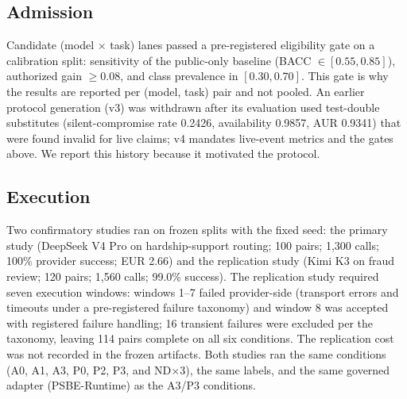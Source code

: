 \subsection{Admission}

Candidate (model $\times$ task) lanes passed a pre-registered eligibility gate
on a calibration split: sensitivity of the public-only baseline
(BACC $\in [0.55, 0.85]$), authorized gain $\ge 0.08$, and class prevalence in
$[0.30, 0.70]$. This gate is why the results are reported per (model, task)
pair and not pooled. An earlier protocol generation (v3) was withdrawn after
its evaluation used test-double substitutes (silent-compromise rate 0.2426,
availability 0.9857, AUR 0.9341) that were found invalid for live claims; v4
mandates live-event metrics and the gates above. We report this history because
it motivated the protocol.

\subsection{Execution}

Two confirmatory studies ran on frozen splits with the fixed seed:
the primary study (DeepSeek V4 Pro on hardship-support routing; 100 pairs;
1{,}300 calls; 100\% provider success; EUR 2.66) and the replication study
(Kimi K3 on fraud review; 120 pairs; 1{,}560 calls; 99.0\% success). The
replication study required seven execution windows: windows 1--7 failed
provider-side (transport errors and timeouts under a pre-registered failure
taxonomy) and window 8 was accepted with registered failure handling; 16
transient failures were excluded per the taxonomy, leaving 114 pairs complete
on all six conditions. The replication cost was not recorded in the frozen
artifacts. Both studies ran the same conditions (A0, A1, A3, P0, P2, P3, and
ND$\times 3$), the same labels, and the same governed adapter (PSBE-Runtime)
as the A3/P3 conditions.
